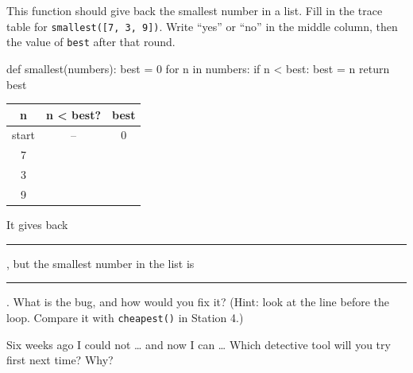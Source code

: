 \begin{exercise}
This function should give back the smallest number in a list. Fill in the trace table for \texttt{smallest([7, 3, 9])}.
Write \enquote{yes} or \enquote{no} in the middle column, then the value of \texttt{best} after that round.
\begin{center}
\begin{minipage}{0.45\linewidth}
\begin{pycode}
def smallest(numbers):
    best = 0
    for n in numbers:
        if n < best:
            best = n
    return best
\end{pycode}
\end{minipage}\hfill
\begin{minipage}{0.45\linewidth}
\renewcommand{\arraystretch}{1.4}
\begin{tabular}{|c|c|c|}
\hline \textbf{n} & \textbf{n < best?} & \textbf{best} \\ \hline
start & -- & 0 \\ \hline
7 & & \\ \hline
3 & & \\ \hline
9 & & \\ \hline
\end{tabular}
\end{minipage}
\end{center}
It gives back \rule{1.5cm}{0.4pt}, but the smallest number in the list is \rule{1.5cm}{0.4pt}. What is the bug, and how would you fix it?
(Hint: look at the line before the loop. Compare it with \texttt{cheapest()} in Station 4.)
\end{exercise}

\begin{vocab}
\end{vocab}

\begin{reflection}
Six weeks ago I could not \ldots{} and now I can \ldots
{}
Which detective tool will you try first next time? Why?
\end{reflection}
